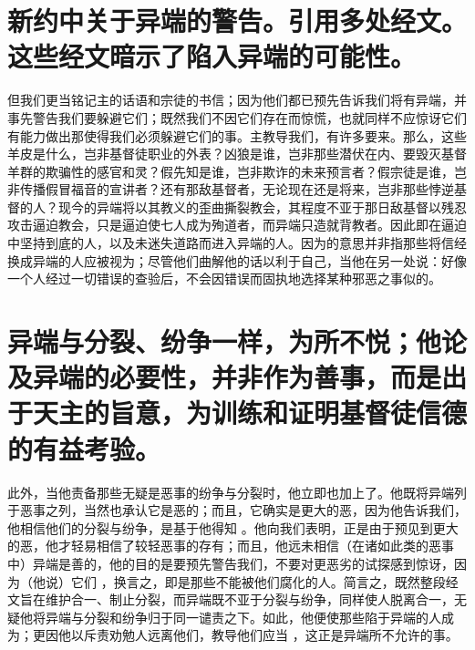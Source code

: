 
\section{新约中关于异端的警告。引用多处经文。这些经文暗示了陷入异端的可能性。}

但我们更当铭记主的话语和宗徒的书信；因为他们都已预先告诉我们将有异端，并事先警告我们要躲避它们；既然我们不因它们存在而惊慌，也就同样不应惊讶它们有能力做出那使得我们必须躲避它们的事。主教导我们，有许多要来。那么，这些羊皮是什么，岂非基督徒职业的外表？凶狼是谁，岂非那些潜伏在内、要毁灭基督羊群的欺骗性的感官和灵？假先知是谁，岂非欺诈的未来预言者？假宗徒是谁，岂非传播假冒福音的宣讲者？还有那敌基督者，无论现在还是将来，岂非那些悖逆基督的人？现今的异端将以其教义的歪曲撕裂教会，其程度不亚于那日敌基督以残忍攻击逼迫教会，只是逼迫使七人成为殉道者，而异端只造就背教者。因此即在逼迫中坚持到底的人，以及未迷失道路而进入异端的人。因为的意思并非指那些将信经换成异端的人应被视为；尽管他们曲解他的话以利于自己，当他在另一处说：好像一个人经过一切错误的查验后，不会因错误而固执地选择某种邪恶之事似的。\par


\section{异端与分裂、纷争一样，为所不悦；他论及异端的必要性，并非作为善事，而是出于天主的旨意，为训练和证明基督徒信德的有益考验。}

此外，当他责备那些无疑是恶事的纷争与分裂时，他立即也加上了。他既将异端列于恶事之列，当然也承认它是恶的；而且，它确实是更大的恶，因为他告诉我们，他相信他们的分裂与纷争，是基于他得知 。他向我们表明，正是由于预见到更大的恶，他才轻易相信了较轻恶事的存有；而且，他远未相信（在诸如此类的恶事中）异端是善的，他的目的是要预先警告我们，不要对更恶劣的试探感到惊讶，因为（他说）它们 ，换言之，即是那些不能被他们腐化的人。简言之，既然整段经文旨在维护合一、制止分裂，而异端既不亚于分裂与纷争，同样使人脱离合一，无疑他将异端与分裂和纷争归于同一谴责之下。如此，他便使那些陷于异端的人成为；更因他以斥责劝勉人远离他们，教导他们应当 ，这正是异端所不允许的事。\par

